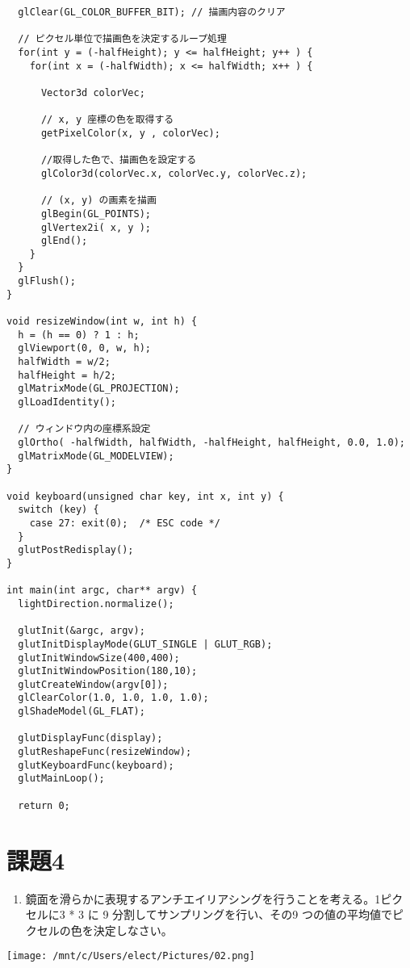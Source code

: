 \documentclass{scrartcl}
\begin{document}
\begin{verbatim}
  glClear(GL_COLOR_BUFFER_BIT); // 描画内容のクリア

  // ピクセル単位で描画色を決定するループ処理
  for(int y = (-halfHeight); y <= halfHeight; y++ ) {
    for(int x = (-halfWidth); x <= halfWidth; x++ ) {

      Vector3d colorVec;

      // x, y 座標の色を取得する
      getPixelColor(x, y , colorVec);

      //取得した色で、描画色を設定する
      glColor3d(colorVec.x, colorVec.y, colorVec.z);

      // (x, y) の画素を描画
      glBegin(GL_POINTS);
      glVertex2i( x, y );
      glEnd();
    }
  }
  glFlush();
}

void resizeWindow(int w, int h) {
  h = (h == 0) ? 1 : h;
  glViewport(0, 0, w, h);
  halfWidth = w/2;
  halfHeight = h/2;
  glMatrixMode(GL_PROJECTION);
  glLoadIdentity();

  // ウィンドウ内の座標系設定
  glOrtho( -halfWidth, halfWidth, -halfHeight, halfHeight, 0.0, 1.0);
  glMatrixMode(GL_MODELVIEW);
}

void keyboard(unsigned char key, int x, int y) {
  switch (key) {
    case 27: exit(0);  /* ESC code */
  }
  glutPostRedisplay();
}

int main(int argc, char** argv) {
  lightDirection.normalize();

  glutInit(&argc, argv);
  glutInitDisplayMode(GLUT_SINGLE | GLUT_RGB);
  glutInitWindowSize(400,400);
  glutInitWindowPosition(180,10);
  glutCreateWindow(argv[0]);
  glClearColor(1.0, 1.0, 1.0, 1.0);
  glShadeModel(GL_FLAT);

  glutDisplayFunc(display);
  glutReshapeFunc(resizeWindow);
  glutKeyboardFunc(keyboard);
  glutMainLoop();

  return 0;

\end{verbatim}

\section{課題4}
\label{sec:orgfb78d34}
\begin{enumerate}
\item 鏡面を滑らかに表現するアンチエイリアシングを行うことを考える。1ピクセルに3 * 3 に 9 分割してサンプリングを行い、その9 つの値の平均値でピクセルの色を決定しなさい。\\
\end{enumerate}

\begin{center}
\texttt{[image: /mnt/c/Users/elect/Pictures/02.png]}
\end{center}
\end{document}
